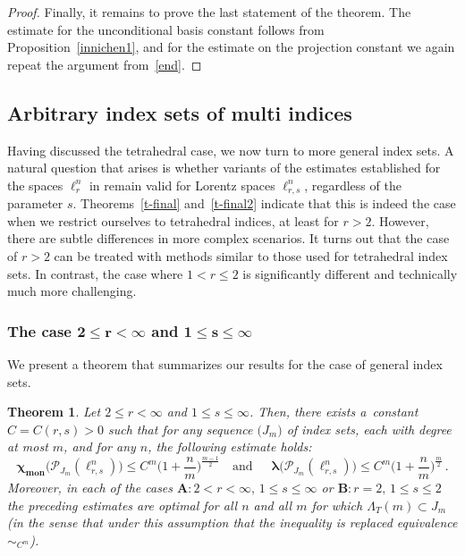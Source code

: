 \documentclass[12pt]{amsart}
\numberwithin{subsection}{section}
\newtheorem{theorem}{Theorem}[section]
\theoremstyle{definition}
\theoremstyle{remark}
\DeclareMathOperator{\mon}{mon}
\newcommand{\chimon}{\chi_{\mon}}
\begin{document}
\begin{proof}
Finally, it remains to prove the last statement of the theorem. The estimate for the unconditional basis constant follows
from Proposition~\ref{innichen1}, and for the estimate on the projection constant we again repeat the argument from~\eqref{end}.
\end{proof}



\subsection{Arbitrary index sets of multi indices}

Having discussed the tetrahedral case, we now turn to more general index sets. A natural question that arises is whether
variants of the estimates established for the spaces $\ell_r^n$ in \cite{bayart2019monomial, defant2011bohr} remain valid
for Lorentz spaces $\ell_{r,s}^n$, regardless of the parameter $s$. Theorems~\ref{t-final} and~\ref{t-final2} indicate that
this is indeed the case when we restrict ourselves to tetrahedral indices, at least for $r > 2$. However, there are subtle
differences in more complex scenarios. It turns out that the case of $r > 2$ can be treated with methods similar to those
used for tetrahedral index sets. In contrast, the case where $1 < r \leq 2$ is significantly different and technically much more challenging.

\subsubsection{\bf The case $\pmb{2 \leq r < \infty}$ and $\pmb{1 \leq s \leq \infty}$}

We present a theorem that summarizes our results for the case of general index sets.



\begin{theorem} \label{t-finalII}
Let $2 \leq r < \infty$ and $1 \leq s \leq \infty$. Then, there exists a~constant $C=C(r, s)>0$ such that for any sequence
$\big(J_m\big)$ of index sets, each with degree at most $m$, and for any $n$, the following estimate holds{\rm:}
\begin{equation*} 
 \boldsymbol{\chimon}\big(\mathcal{P}_{J_m}(\ell_{r,s}^n) \big) \leq C^m \Big( 1+\frac{n}{m}\Big)^{\frac{m-1}{2}}
\,\,\,\, \text{ and } \,\,\,\,\,\,\,
\boldsymbol{\lambda}\big(\mathcal{P}_{J_m}(\ell_{r,s}^n) \big) \leq C^m \Big(1+ \frac{n}{m}\Big)^{\frac{m}{2}}\,.
\end{equation*}
Moreover, in each of the cases
$\mathbf{A}: 2 < r < \infty, \,1 \leq s \leq \infty $
or
$\mathbf{B}: r= 2, \,1 \leq s \leq  2$
the preceding estimates are optimal for all $n$ and  all $m$ for which   $\Lambda_T(m) \subset J_m$ (in the sense that under this assumption that the inequality is replaced equivalence $\sim_{C^m}$).
\end{theorem}
\end{document}
